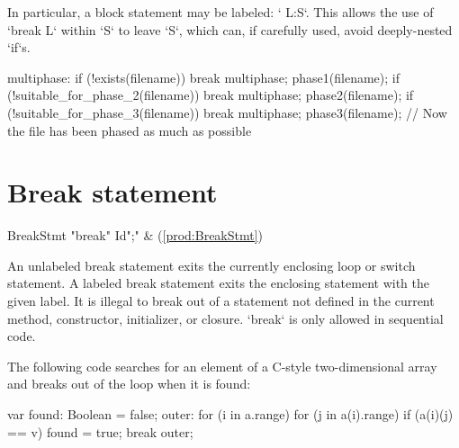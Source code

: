 In particular, a block statement may be labeled: \xcd` L:{S}`.  This allows
the use of \xcd`break L` within \xcd`S` to leave \xcd`S`, which can, if
carefully used, avoid deeply-nested \xcd`if`s. 

\begin{ex}
\begin{xten}
multiphase: {
  if (!exists(filename)) break multiphase;
  phase1(filename);
  if (!suitable_for_phase_2(filename)) break multiphase;
  phase2(filename);
  if (!suitable_for_phase_3(filename)) break multiphase;
  phase3(filename);
}
// Now the file has been phased as much as possible
\end{xten}
\end{ex}


\section{Break statement}

\begin{bbgrammar}
           BreakStmt \: \xcd"break" Id\opt \xcd";" & (\ref{prod:BreakStmt}) \\
\end{bbgrammar}


An unlabeled break statement exits the currently enclosing loop or switch
statement. A labeled break statement exits the enclosing 
statement with the given label.
It is illegal to break out of a statement not defined in the current
method, constructor, initializer, or closure.  
\xcd`break` is only allowed in sequential code.

\begin{ex}
The following code searches for an element of a C-style two-dimensional
array and breaks out of the loop when it is found:
\begin{xten}
var found: Boolean = false;
outer: for (i in a.range)
    for (j in a(i).range)
        if (a(i)(j) == v) {
            found = true;
            break outer;
        }
\end{xten}
\end{ex}

